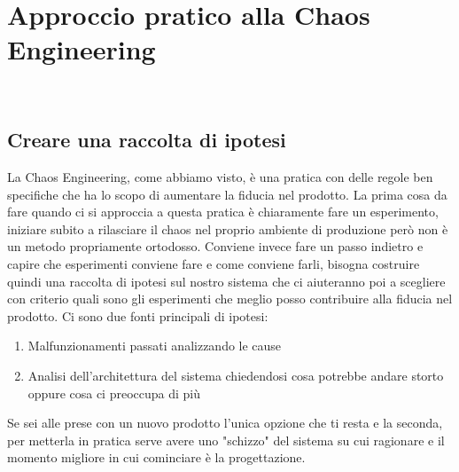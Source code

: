 
\chapter{Approccio pratico alla Chaos Engineering}
\label{cap:descrizione-stage}

\\

\section{Creare una raccolta di ipotesi}
La Chaos Engineering, come abbiamo visto, è una pratica con delle regole ben specifiche che ha lo scopo di aumentare la fiducia nel prodotto.
La prima cosa da fare quando ci si approccia a questa pratica è chiaramente fare un esperimento, iniziare subito a rilasciare il chaos nel proprio ambiente di produzione però non è un metodo propriamente ortodosso.
Conviene invece fare un passo indietro e capire che esperimenti conviene fare e come conviene farli, bisogna costruire quindi una raccolta di ipotesi sul nostro sistema che ci aiuteranno poi a scegliere con criterio quali sono gli esperimenti che meglio posso contribuire alla fiducia nel prodotto.
Ci sono due fonti principali di ipotesi:
\begin{enumerate}
    \item Malfunzionamenti passati analizzando le cause
    \item Analisi dell'architettura del sistema chiedendosi cosa potrebbe andare storto oppure cosa ci preoccupa di più
\end{enumerate}
Se sei alle prese con un nuovo prodotto l'unica opzione che ti resta e la seconda, per metterla in pratica serve avere uno "schizzo" del sistema su cui ragionare e il momento migliore in cui cominciare è la progettazione.

